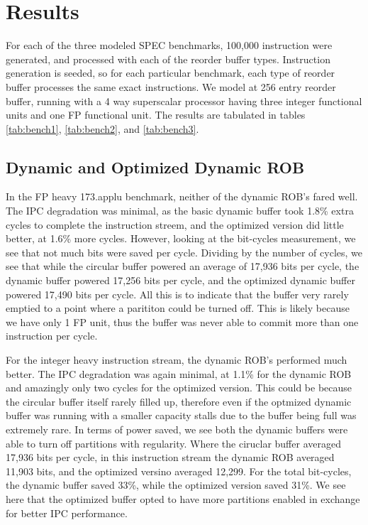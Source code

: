 \def\topfraction{.9}
\def\floatpagefraction{.8}

\section{Results}
For each of the three modeled SPEC benchmarks, 100,000 instruction were generated, and processed with each of the reorder buffer types. Instruction generation is seeded, so for each particular benchmark, each type of reorder buffer processes the same exact instructions. We model at 256 entry reorder buffer, running with a 4 way superscalar processor having three integer functional units and one FP functional unit. The results are tabulated in tables \ref{tab:bench1}, \ref{tab:bench2}, and \ref{tab:bench3}.



\subsection{Dynamic and Optimized Dynamic ROB}
In the FP heavy 173.applu benchmark, neither of the dynamic ROB's fared well. The IPC degradation was minimal, as the basic dynamic buffer took 1.8\% extra cycles to complete the instruction streem, and the optimized version did little better, at 1.6\% more cycles. However, looking at the bit-cycles measurement, we see that not much bits were saved per cycle. Dividing by the number of cycles, we see that while the circular buffer powered an average of 17,936 bits per cycle, the dynamic buffer powered 17,256 bits per cycle, and the optimized dynamic buffer powered 17,490 bits per cycle. All this is to indicate that the buffer very rarely emptied to a point where a parititon could be turned off. This is likely because we have only 1 FP unit, thus the buffer was never able to commit more than one instruction per cycle.

For the integer heavy instruction stream, the dynamic ROB's performed much better. The IPC degradation was again minimal, at 1.1\% for the dynamic ROB and amazingly only two cycles for the optimized version. This could be because the circular buffer itself rarely filled up, therefore even if the optmized dynamic buffer was running with a smaller capacity stalls due to the buffer being full was extremely rare. In terms of power saved, we see both the dynamic buffers were able to turn off partitions with regularity. Where the ciruclar buffer averaged 17,936 bits per cycle, in this instruction stream the dynamic ROB averaged 11,903 bits, and the optimized versino averaged 12,299. For the total bit-cycles, the dynamic buffer saved 33\%, while the optimized version saved 31\%. We see here that the optimized buffer opted to have more partitions enabled in exchange for better IPC performance.

